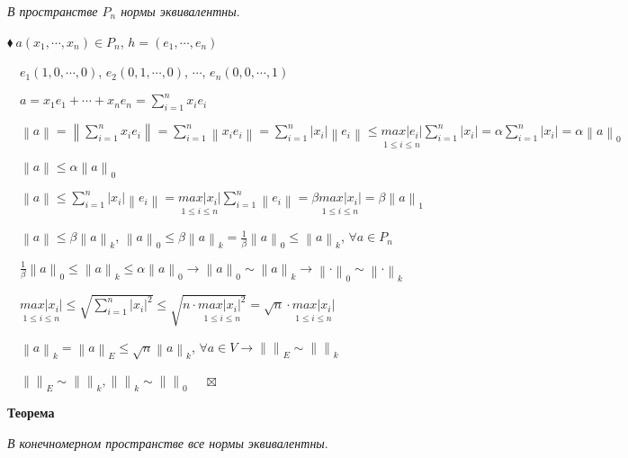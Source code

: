 \documentclass[a4paper, 12pt]{report}
\begin{document}
	\textit{В пространстве $P_n$ нормы эквивалентны}.
	\par\bigskip
	$\blacklozenge\ a(x_1, \cdots, x_n) \in P_n$, $h = (e_1, \cdots, e_n)$
	\par\bigskip
	$\quad e_1(1, 0, \cdots, 0)$, $e_2(0, 1, \cdots, 0)$, $\cdots$, $e_n(0, 0, \cdots, 1)$
	\par\bigskip
	$\quad a = x_1e_1 + \cdots + x_ne_n = \sum\limits_{i=1}^{n}{x_ie_i}$
	\par\bigskip
	$\quad \left \|a\right \|=\left \|\sum\limits_{i=1}^{n}{x_ie_i}\right \|=\sum\limits_{i=1}^{n}{\left \|x_ie_i\right \|}=\sum\limits_{i=1}^{n}{|x_i|\left \|e_i\right \|}\leqslant \underset{1 \leqslant i \leqslant n}{max|e_i|}\sum\limits_{i=1}^{n}{|x_i|}=\alpha\sum\limits_{i=1}^{n}{|x_i|}=\alpha\left \|a\right \|_0$
	\par\bigskip
	$\quad \left \|a\right \| \leqslant \alpha \left \|a\right \|_0$
	\par\bigskip
	$\quad \left \|a\right \| \leqslant \sum\limits_{i=1}^{n}{|x_i|\left \|e_i\right \|}= \underset{1 \leqslant i \leqslant n}{max|x_i|}\sum\limits_{i=1}^{n}{\left \|e_i\right \|}=\beta\underset{1 \leqslant i \leqslant n}{max|x_i|}=\beta\left \|a\right \|_1$
	\par\bigskip
	$\quad \left \|a\right \| \leqslant \beta\left \|a\right \|_k$, $\left \|a\right \|_0 \leqslant \beta\left \|a\right \|_k=\frac{1}{\beta}\left \|a\right \|_0 \leqslant \left \|a\right \|_k$, $\forall a \in P_n$
	\par\bigskip
	$\quad \frac{1}{\beta}\left \|a\right \|_0 \leqslant \left \|a\right \|_k \leqslant \alpha \left \|a\right \|_0 \rightarrow \left \|a\right \|_0 \sim \left \|a\right \|_k \rightarrow  \left \|\cdot\right \|_0 \sim \left \|\cdot\right \|_k$
	\par\bigskip
	$\quad \underset{1 \leqslant i \leqslant n}{max|x_i|}\leq\sqrt{\sum\limits_{i=1}^{n}{|x_i|^2}}\leq\sqrt{n\cdot\underset{1 \leqslant i \leqslant n}{max|x_i|^2}}=\sqrt{n}\cdot\underset{1 \leqslant i \leqslant n}{max|x_i|}$
	\par\bigskip
	$\quad \left \|a\right \|_k=\left \|a\right \|_E\leqslant \sqrt{n}\left \|a\right \|_k$, $\forall a \in V \rightarrow  \left \|\right \|_E \sim \left \|\right \|_k$
	\par\bigskip
	$\quad  \left \|\right \|_E \sim \left \|\right \|_k,  \left \|\right \|_k\sim \left \|\right \|_0 $
	$\quad \boxtimes$
	\par\bigskip
	\textbf{Теорема}
	
	\textit{В конечномерном пространстве все нормы эквивалентны}.
	
\end{document}
